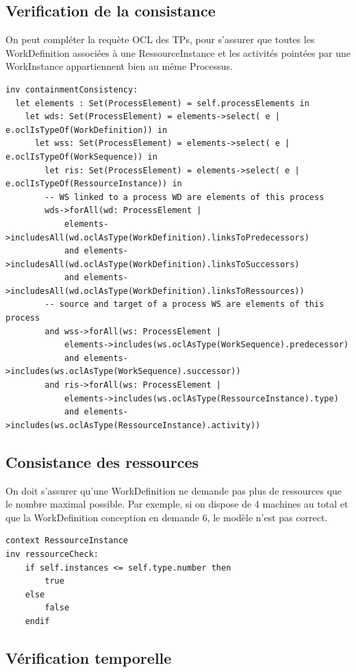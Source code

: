 \documentclass{report}
\begin{document}
\subsection{Verification de la consistance}

On peut compléter la requète OCL des TPs, pour s'assurer que toutes les WorkDefinition associées à une RessourceInstance et les activités pointées par une WorkInstance appartiennent bien au même Processus.

\begin{verbatim}
inv containmentConsistency:
  let elements : Set(ProcessElement) = self.processElements in
    let wds: Set(ProcessElement) = elements->select( e | e.oclIsTypeOf(WorkDefinition)) in
      let wss: Set(ProcessElement) = elements->select( e | e.oclIsTypeOf(WorkSequence)) in
		let ris: Set(ProcessElement) = elements->select( e | e.oclIsTypeOf(RessourceInstance)) in
        -- WS linked to a process WD are elements of this process
        wds->forAll(wd: ProcessElement |
            elements->includesAll(wd.oclAsType(WorkDefinition).linksToPredecessors)
            and elements->includesAll(wd.oclAsType(WorkDefinition).linksToSuccessors)
			and elements->includesAll(wd.oclAsType(WorkDefinition).linksToRessources))
        -- source and target of a process WS are elements of this process
        and wss->forAll(ws: ProcessElement |
            elements->includes(ws.oclAsType(WorkSequence).predecessor)
            and elements->includes(ws.oclAsType(WorkSequence).successor))
		and ris->forAll(ws: ProcessElement |
            elements->includes(ws.oclAsType(RessourceInstance).type)
			and elements->includes(ws.oclAsType(RessourceInstance).activity))
\end{verbatim}

\subsection{Consistance des ressources}

On doit s'assurer qu'une WorkDefinition ne demande pas plus de ressources que le nombre maximal possible.
Par exemple, si on dispose de 4 machines au total et que la WorkDefinition conception en demande 6, le modèle n'est pas correct.

\begin{verbatim}
context RessourceInstance
inv ressourceCheck:
	if self.instances <= self.type.number then
		true
	else
		false
	endif
\end{verbatim}

\subsection{Vérification temporelle}
\end{document}

